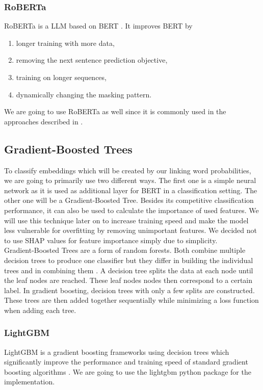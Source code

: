 \subsubsection{RoBERTa}
RoBERTa is a LLM based on BERT \cite{roberta}. It improves BERT by
\begin{enumerate}
	\item longer training with more data,
	\item removing the next sentence prediction objective,
	\item training on longer sequences,
	\item dynamically changing the masking pattern.
\end{enumerate}
We are going to use RoBERTa as well since it is commonly used in the approaches described in \cite{argsvalidnovel2022}.

\subsection{Gradient-Boosted Trees}
To classify embeddings which will be created by our linking word probabilities, we are going to primarily use two different ways. The first one is a simple neural network as it is used as additional layer for BERT in a classification setting. The other one will be a Gradient-Boosted Tree. Besides its competitive classification performance, it can also be used to calculate the importance of used features. We will use this technique later on to increase training speed and make the model less vulnerable for overfitting by removing unimportant features. We decided not to use SHAP values \cite{shap} for feature importance simply due to simplicity. \\
Gradient-Boosted Trees are a form of random forests. Both combine multiple decision trees to produce one classifier but they differ in building the individual trees and in combining them \cite{gradboost}. A decision tree splits the data at each node until the leaf nodes are reached. These leaf nodes nodes then correspond to a certain label. In gradient boosting, decision trees with only a few splits are constructed. These trees are then added together sequentially while minimizing a loss function when adding each tree.

\subsubsection{LightGBM}
LightGBM is a gradient boosting frameworks using decision trees which significantly improve the performance and training speed of standard gradient boosting algorithms \cite{lgbm}. We are going to use the lightgbm python package \cite{lgbmpython} for the implementation.

